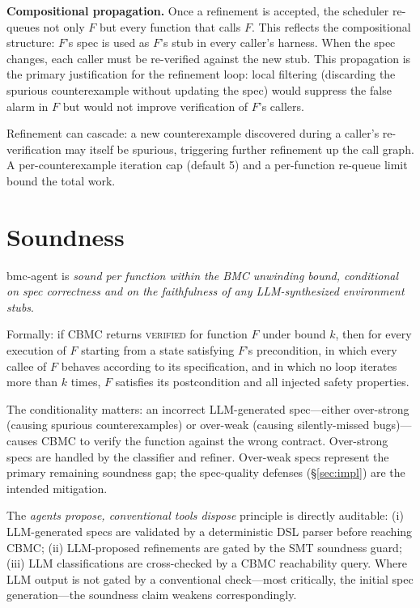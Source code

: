 \documentclass[11pt,a4paper]{article}
\newcommand{\tool}{bmc-agent\xspace}
\begin{document}
\smallskip\noindent\textbf{Compositional propagation.}
Once a refinement is accepted, the scheduler re-queues not only $F$ but every
function that calls $F$. This reflects the compositional structure: $F$'s
spec is used as $F$'s stub in every caller's harness. When the spec changes,
each caller must be re-verified against the new stub. This propagation is the
primary justification for the refinement loop: local filtering (discarding
the spurious counterexample without updating the spec) would suppress the
false alarm in $F$ but would not improve verification of $F$'s callers.

Refinement can cascade: a new counterexample discovered during a caller's
re-verification may itself be spurious, triggering further refinement up the
call graph. A per-counterexample iteration cap (default 5) and a
per-function re-queue limit bound the total work.

\section{Soundness}
\label{sec:soundness}

\tool is \emph{sound per function within the BMC unwinding bound, conditional
on spec correctness and on the faithfulness of any LLM-synthesized environment
stubs}.

Formally: if CBMC returns \textsc{verified} for function $F$ under bound $k$,
then for every execution of $F$ starting from a state satisfying $F$'s
precondition, in which every callee of $F$ behaves according to its
specification, and in which no loop iterates more than $k$ times, $F$
satisfies its postcondition and all injected safety properties.

The conditionality matters: an incorrect LLM-generated spec---either
over-strong (causing spurious counterexamples) or over-weak (causing
silently-missed bugs)---causes CBMC to verify the function against the wrong
contract. Over-strong specs are handled by the classifier and refiner.
Over-weak specs represent the primary remaining soundness gap; the
spec-quality defenses (\S\ref{sec:impl}) are the intended mitigation.

The \emph{agents propose, conventional tools dispose} principle is directly
auditable:
(i) LLM-generated specs are validated by a deterministic DSL parser before
reaching CBMC;
(ii) LLM-proposed refinements are gated by the SMT soundness guard;
(iii) LLM classifications are cross-checked by a CBMC reachability query.
Where LLM output is not gated by a conventional check---most critically, the
initial spec generation---the soundness claim weakens correspondingly.
\end{document}
